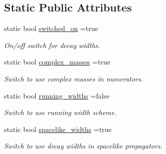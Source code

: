 \subsection*{Static Public Attributes}
\begin{DoxyCompactItemize}
\item 
\hypertarget{a00578_a69bd63c87b6015833e28cde38f10e128}{static bool \hyperlink{a00578_a69bd63c87b6015833e28cde38f10e128}{switched\-\_\-on} =true}\label{a00578_a69bd63c87b6015833e28cde38f10e128}

\begin{DoxyCompactList}\small\item\em On/off switch for decay widths. \end{DoxyCompactList}\item 
\hypertarget{a00578_a2ee4ca7f906d68bfe1d1e70b45be5617}{static bool \hyperlink{a00578_a2ee4ca7f906d68bfe1d1e70b45be5617}{complex\-\_\-masses} =true}\label{a00578_a2ee4ca7f906d68bfe1d1e70b45be5617}

\begin{DoxyCompactList}\small\item\em Switch to use complex masses in numerators. \end{DoxyCompactList}\item 
\hypertarget{a00578_a5cd7dd85a52f0a435d82e0ffdf8d8442}{static bool \hyperlink{a00578_a5cd7dd85a52f0a435d82e0ffdf8d8442}{running\-\_\-widths} =false}\label{a00578_a5cd7dd85a52f0a435d82e0ffdf8d8442}

\begin{DoxyCompactList}\small\item\em Switch to use running width scheme. \end{DoxyCompactList}\item 
\hypertarget{a00578_ade2afe8bfe82478e458c4949597f9f1a}{static bool \hyperlink{a00578_ade2afe8bfe82478e458c4949597f9f1a}{spacelike\-\_\-widths} =true}\label{a00578_ade2afe8bfe82478e458c4949597f9f1a}

\begin{DoxyCompactList}\small\item\em Switch to use decay widths in spacelike propagators. \end{DoxyCompactList}\end{DoxyCompactItemize}


